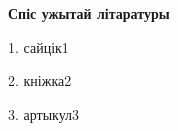 \begin{center}
    {\bf Спіс ужытай літаратуры}
\end{center}

1. сайцік1

2. кніжка2

3. артыкул3

\newpage